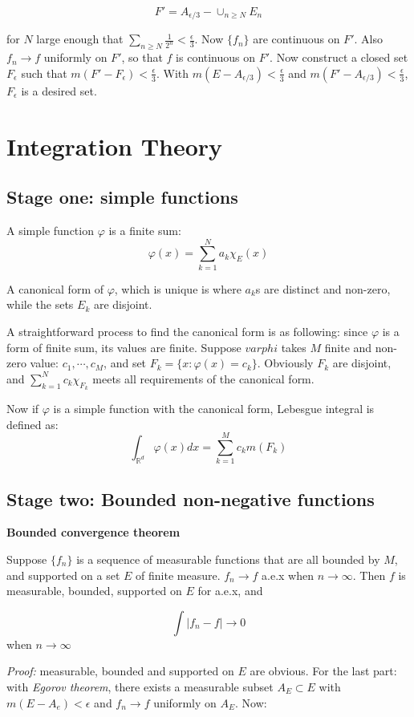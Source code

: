 \documentclass[
]{article}
\begin{document}
\[F'=A_{\epsilon/3}-\cup_{n\geq N}E_n\]

for \(N\) large enough that \(\sum_{n\geq N}\frac{1}{2^n}<\frac{\epsilon}{3}\). Now \(\{f_n\}\) are continuous on
\(F'\). Also \(f_n\to f\) uniformly on \(F'\), so that \(f\) is continuous on \(F'\). Now construct a closed set \(F_{\epsilon}\)
such that \(m(F'-F_{\epsilon})<\frac{\epsilon}{3}\). With \(m(E-A_{\epsilon/3})<\frac{\epsilon}{3}\) and \(m(F'-A_{\epsilon/3})<\frac{\epsilon}{3}\),
\(F_{\epsilon}\) is a desired set.

\section{Integration Theory}

\subsection{Stage one: simple functions}
A simple function \(\varphi\) is a finite sum:
\[\varphi(x)=\sum_{k=1}^N a_k \chi_{E}(x)\]

A canonical form of \(\varphi\), which is unique is where \(a_k\)s are distinct and non-zero, while
the sets \(E_k\) are disjoint.

A straightforward process to find the canonical form is as following: since \(\varphi\) is a form of finite sum,
its values are finite. Suppose \(varphi\) takes \(M\) finite and non-zero value: \(c_1, \cdots, c_M\), and
set \(F_k=\{x: \varphi(x)=c_k\}\). Obviously \(F_k\) are disjoint, and \(\sum_{k=1}^Nc_k\chi_{F_k}\) meets all
requirements of the canonical form.

Now if \(\varphi\) is a simple function with the canonical form, Lebesgue integral is defined as:
\[\int_{\mathbb{R}^d}\varphi(x)dx=\sum_{k=1}^Mc_km(F_k)\]

\subsection{Stage two: Bounded non-negative functions}

\textbf{Bounded convergence theorem}

Suppose \(\{f_n\}\) is a sequence of measurable functions that are all bounded by \(M\), and supported
on a set \(E\) of finite measure. \(f_n\to f\) a.e.x when \(n\to\infty\). Then \(f\) is measurable,
bounded, supported on \(E\) for a.e.x, and

\[\int |f_n-f|\to 0\] when \(n\to\infty\)

\textit{Proof:} measurable, bounded and supported on \(E\) are obvious. For the last part: with
\textit{Egorov theorem}, there exists a measurable subset \(A_E\subset E\) with \(m(E-A_e)<\epsilon\) and
\(f_n\to f\) uniformly on \(A_E\). Now:
\end{document}
